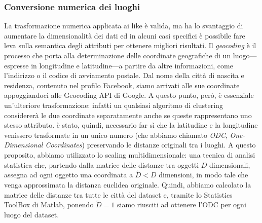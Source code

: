 \subsubsection{Conversione numerica dei luoghi}
\label{subsec:conversione_luoghi}
La trasformazione numerica applicata ai like \`e valida, ma ha lo svantaggio di aumentare la dimensionalit\`a dei dati ed in alcuni casi specifici \`e possibile fare leva sulla semantica degli attributi per ottenere migliori risultati. Il \textit{geocoding} \`e il processo che porta alla determinazione delle coordinate geografiche di un luogo---espresse in longitudine e latitudine---a partire da altre informazioni, come l'indirizzo o il codice di avviamento postale. Dal nome della citt\`a di nascita e residenza, contenuto nel profilo Facebook, siamo arrivati alle sue coordinate appoggiandoci alle Geocoding API di Google. A questo punto, per\`o, \`e essenziale un'ulteriore trasformazione: infatti un qualsiasi algoritmo di clustering considerer\`a le due coordinate separatamente anche se queste rappresentano uno stesso attributo. \`e stato, quindi, necessario far s\`i che la latitudine e la longitudine venissero trasformate in un unico numero (che abbiamo chiamato \textit{ODC}, \textit{One-Dimensional Coordinates}) preservando le distanze originali tra i luoghi. A questo proposito, abbiamo utilizzato lo scaling multidimensionale: una tecnica di analisi statistica che, partendo dalla matrice delle distanze tra oggetti $ D $ dimensionali, assegna ad ogni oggetto una coordinata a $ \tilde{D} < D $ dimensioni, in modo tale che venga approssimata la distanza euclidea originale. Quindi, abbiamo calcolato la matrice delle distanze tra tutte le citt\`a del dataset e, tramite lo Statistics ToolBox di Matlab, ponendo $ \tilde{D} = 1 $ siamo riusciti ad ottenere l'ODC per ogni luogo del dataset.
